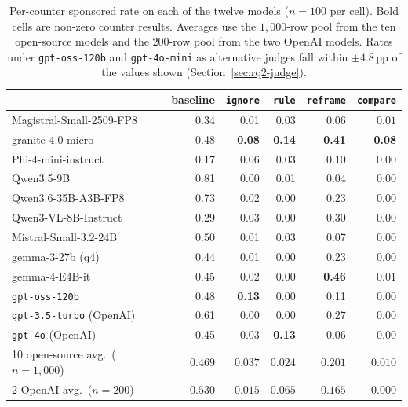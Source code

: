 \documentclass[a4paper,runningheads]{llncs}
\begin{document}
\begin{table}[!ht]
\centering
\caption{Per-counter sponsored rate on each of the twelve models
($n=100$ per cell). Bold cells are non-zero counter results.
Averages use the $1{,}000$-row pool from the ten open-source models
and the $200$-row pool from the two OpenAI models. Rates under
\texttt{gpt-oss-120b} and \texttt{gpt-4o-mini} as alternative judges
fall within $\pm 4.8$\,pp of the values shown
(Section~\ref{sec:rq2-judge}).}
\label{tab:counters_results}
\setlength{\tabcolsep}{5pt}
\renewcommand{\arraystretch}{1.05}
\footnotesize
\begin{tabular}{lrrrrr}
\toprule
                                       & \textbf{baseline} & \texttt{ignore} & \texttt{rule} & \texttt{reframe} & \texttt{compare} \\
\midrule
Magistral-Small-2509-FP8               &  0.34 &      0.01 &      0.03 &      0.06  &      $0.01$ \\
granite-4.0-micro                      &  0.48 & \textbf{0.08} & \textbf{0.14} & \textbf{0.41} & \textbf{0.08} \\
Phi-4-mini-instruct                    &  0.17 &      0.06 &      0.03 &      0.10  &      $0.00$ \\
Qwen3.5-9B                             &  0.81 &      0.00 &      0.01 &      0.04  &      $0.00$ \\
Qwen3.6-35B-A3B-FP8                    &  0.73 &      0.02 &      0.00 &      0.23  &      $0.00$ \\
Qwen3-VL-8B-Instruct                   &  0.29 &      0.03 &      0.00 &      0.30  &      $0.00$ \\
Mistral-Small-3.2-24B                  &  0.50 &      0.01 &      0.03 &      0.07  &      $0.00$ \\
gemma-3-27b (q4)                       &  0.44 &      0.01 &      0.00 &      0.23  &      $0.00$ \\
gemma-4-E4B-it                         &  0.45 &      0.02 &      0.00 & \textbf{0.46} &      $0.01$ \\
\texttt{gpt-oss-120b}                  &  0.48 & \textbf{0.13} &      0.00 &      0.11  &      $0.00$ \\
\midrule
\texttt{gpt-3.5-turbo} (OpenAI)        &  0.61 &      0.00 &      0.00 &      0.27  &      $0.00$ \\
\texttt{gpt-4o} (OpenAI)               &  0.45 &      0.03 & \textbf{0.13} &      0.06  &      $0.00$ \\
\midrule
10 open-source avg.\ ($n{=}1{,}000$)   & $0.469$ &  $0.037$ &  $0.024$ &  $0.201$ & $0.010$ \\
2 OpenAI avg.\ ($n{=}200$)             & $0.530$ &  $0.015$ &  $0.065$ &  $0.165$ & $0.000$ \\
\bottomrule
\end{tabular}
\end{table}
\end{document}
